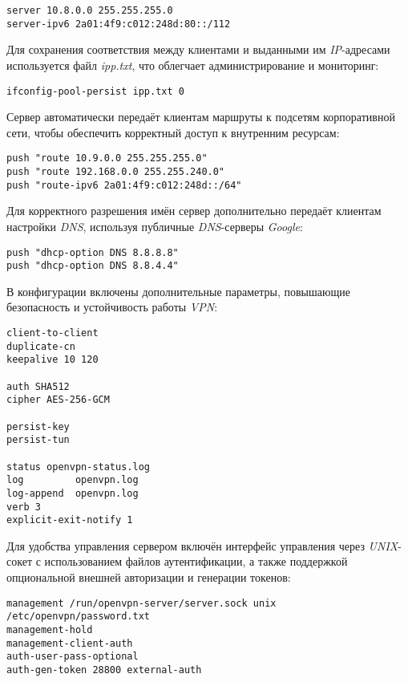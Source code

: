 \begin{lstlisting}
server 10.8.0.0 255.255.255.0
server-ipv6 2a01:4f9:c012:248d:80::/112
\end{lstlisting}

Для сохранения соответствия между клиентами и выданными им \textit{IP}-адресами используется файл \textit{ipp.txt}, что облегчает администрирование и мониторинг:

\begin{lstlisting}
ifconfig-pool-persist ipp.txt 0
\end{lstlisting}

Сервер автоматически передаёт клиентам маршруты к подсетям корпоративной сети, чтобы обеспечить корректный доступ к внутренним ресурсам:

\begin{lstlisting}
push "route 10.9.0.0 255.255.255.0"
push "route 192.168.0.0 255.255.240.0"
push "route-ipv6 2a01:4f9:c012:248d::/64"
\end{lstlisting}

Для корректного разрешения имён сервер дополнительно передаёт клиентам настройки \textit{DNS}, используя публичные \textit{DNS}-серверы \textit{Google}:

\begin{lstlisting}
push "dhcp-option DNS 8.8.8.8"
push "dhcp-option DNS 8.8.4.4"
\end{lstlisting}

В конфигурации включены дополнительные параметры, повышающие безопасность и устойчивость работы \textit{VPN}:

\begin{lstlisting}
client-to-client
duplicate-cn
keepalive 10 120

auth SHA512
cipher AES-256-GCM

persist-key
persist-tun

status openvpn-status.log
log         openvpn.log
log-append  openvpn.log
verb 3
explicit-exit-notify 1
\end{lstlisting}

Для удобства управления сервером включён интерфейс управления через \textit{UNIX}-сокет с использованием файлов аутентификации, а также поддержкой опциональной внешней авторизации и генерации токенов:

\begin{lstlisting}
management /run/openvpn-server/server.sock unix /etc/openvpn/password.txt
management-hold
management-client-auth
auth-user-pass-optional
auth-gen-token 28800 external-auth
\end{lstlisting}

